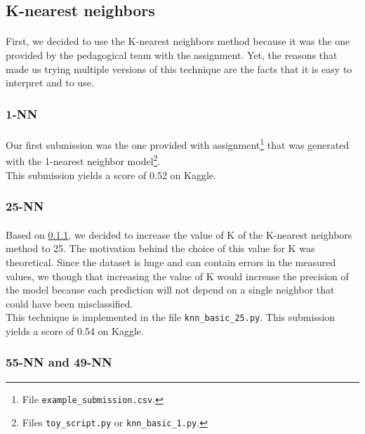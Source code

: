 \documentclass[a4paper, 11pt, oneside]{article}
\begin{document}

\subsection{K-nearest neighbors}
\paragraph{}First, we decided to use the K-nearest neighbors method because it was the one provided by the pedagogical team with the assignment. Yet, the reasons that made us trying multiple versions of this technique are the facts that it is easy to interpret and to use.

\subsubsection{1-NN} \label{subsubsec:1NN}
\paragraph{}Our first submission was the one provided with assignment\footnote{File \texttt{example\_submission.csv}.} that was generated with the 1-nearest neighbor model\footnote{Files \texttt{toy\_script.py} or \texttt{knn\_basic\_1.py}.}.\\
This submission yields a score of 0.52 on Kaggle.

\subsubsection{25-NN} \label{subsubsec:25NN}
\paragraph{}Based on \ref{subsubsec:1NN}, we decided to increase the value of K of the K-nearest neighbors method to 25. The motivation behind the choice of this value for K was theoretical. Since the dataset is huge and can contain errors in the measured values, we though that increasing the value of K would increase the precision of the model because each prediction will not depend on a single neighbor that could have been misclassified.\\
This technique is implemented in the file \texttt{knn\_basic\_25.py}. This submission yields a score of 0.54 on Kaggle.

\subsubsection{55-NN and 49-NN} \label{subsubsec:55-49-NN}
\end{document}
